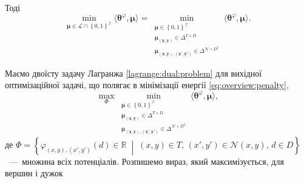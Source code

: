 Тоді
\begin{equation*}
    \min \limits_{\pmb{\mu} \in \mathcal{L} \cap \left\{0, 1 \right\}^{\mathcal{I}}}
        \langle \pmb{\theta}^{\varphi}, \pmb{\mu} \rangle =
    \min \limits_{\substack{\pmb{\mu} \in \left\{ 0, 1 \right\}^{\mathcal{I}} \\
                            \pmb{\mu_{\left(x, y \right)}} \in \Delta^{T \times D} \\
                            \pmb{\mu_{\left(x, y \right), \left(x', y' \right)}} \in
                                \Delta^{\mathcal{N} \times D^2}}}
        \langle \pmb{\theta}^{\varphi}, \pmb{\mu} \rangle.
\end{equation*}

Маємо двоїсту задачу Лагранжа \eqref{lagrange:dual:problem}
для вихідної оптимізаційної задачі,
що полягає в мінімізації енергії \eqref{eq:overview:penalty},
\begin{equation*}
    \max \limits_{\Phi}
        \min \limits_{\substack{\pmb{\mu} \in \left\{ 0, 1 \right\}^{\mathcal{I}} \\
                                \pmb{\mu_{\left(x, y \right)}} \in \Delta^{T \times D} \\
                                \pmb{\mu_{\left(x, y \right), \left(x', y' \right)}} \in
                                    \Delta^{\mathcal{N} \times D^2}}}
            \langle \pmb{\theta}^{\varphi}, \pmb{\mu} \rangle,
\end{equation*}
де
$\Phi = \left\{
    \varphi_{\left(x, y \right), \left(x', y' \right)} \left(
        d
    \right) \in \mathbb{R} \; \middle| \;
    \left(x, y \right) \in T, \,
    \left(x', y' \right) \in \mathcal{N} \left(x, y \right), \,
    d \in D
\right\}$~---~множина всіх потенціалів.
Розпишемо вираз, який максимізується, для вершин і дужок
